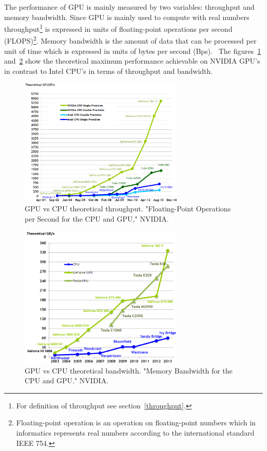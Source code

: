\documentclass[12pt,oneside]{fithesis2}
\begin{document}
The performance of GPU is mainly measured by two variables: throughput and memory bandwidth. Since GPU is mainly used to compute with real numbers throughput\footnote{For definition of throughput see section~\ref{throughput}.} is expressed in units of floating-point operations per second (FLOPS)\footnote{Floating-point operation is an operation on floating-point numbers which in informatics represents real numbers according to the international standard IEEE 754.}. Memory bandwidth is the amount of data that can be processed per unit of time which is expressed in units of bytes per second (Bps).~\cite{professional_cuda} The figures~\ref{fig:gpu_throughput} and~\ref{fig:gpu_bandwith} show the theoretical maximum performance achievable on NVIDIA GPU's in contrast to Intel CPU's in terms of throughput and bandwidth.

\begin{figure}[H]
	\centering
	\includegraphics[width=0.7\textwidth]{figures/floating-point-operations-per-second.png}
	\caption{GPU vs CPU theoretical throughput. "Floating-Point Operations per Second for the CPU and GPU," NVIDIA.~\cite{cuda_guide}}
	\label{fig:gpu_throughput}
\end{figure}

\begin{figure}[H]
	\centering
	\includegraphics[width=0.7\textwidth]{figures/memory-bandwidth.png}
	\caption{GPU vs CPU theoretical bandwidth. "Memory Bandwidth for the CPU and GPU." NVIDIA.~\cite{cuda_guide}}
	\label{fig:gpu_bandwith}
\end{figure}
\end{document}
